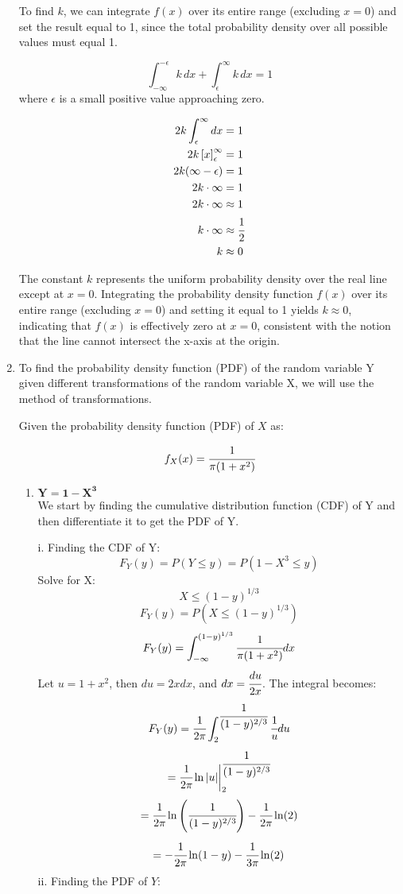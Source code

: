 \documentclass{article}
\begin{document}
\begin{enumerate}
    To find $k$, we can integrate $f(x)$ over its entire range (excluding $x=0$) and set the result equal to 1, since the total probability density over all possible values must equal 1.

    \[
    \int_{-\infty}^{-\epsilon} k\,dx + \int_{\epsilon}^{\infty} k\,dx = 1
    \]
    where $\epsilon$ is a small positive value approaching zero.

    \begin{align*}
    2k\int_{\epsilon}^{\infty} dx &= 1\\
    2k\left[x\right]_{\epsilon}^{\infty} &= 1\\
    2k(\infty - \epsilon) &= 1\\
    2k \cdot \infty &= 1\\
    2k \cdot \infty &\approx 1\\
    k \cdot \infty &\approx \cfrac{1}{2}\\
    k &\approx 0
    \end{align*}

    The constant $k$ represents the uniform probability density over the real line except at $x = 0$. Integrating the probability density function $f(x)$ over its entire range (excluding $x=0$) and setting it equal to 1 yields $k \approx 0$, indicating that $f(x)$ is effectively zero at $x = 0$, consistent with the notion that the line cannot intersect the x-axis at the origin.
    
\newpage
\item
    To find the probability density function (PDF) of the random variable Y given different transformations of the random variable X, we will use the method of transformations.

    Given the probability density function (PDF) of \( X \) as:

    \[ 
        f_X(x) = \cfrac{1}{\pi(1 + x^2)}
    \]
    \begin{enumerate}
        \item 
        \( \mathbf{Y = 1 - X^3}\)\\
        We start by finding the cumulative distribution function (CDF) of Y and then differentiate it to get the PDF of Y.

        i. Finding the CDF of Y:
        \[ 
            F_Y(y) = P(Y \leq y) = P(1 - X^3 \leq y) 
        \]
        Solve for X:
        \[ 
            X \leq (1 - y)^{1/3} 
        \]
        \[ 
            F_Y(y) = P(X \leq (1 - y)^{1/3}) 
        \]
        \[
            F_Y(y) = \int_{-\infty}^{(1 - y)^{1/3}} \cfrac{1}{\pi(1 + x^2)} dx
        \]
        Let $ u = 1 + x^2 $, then $ du = 2x dx $, and $ dx = \cfrac{du}{2x} $.
        The integral becomes:
        \[
            F_Y(y) = \cfrac{1}{2\pi} \int_{2}^{\cfrac{1}{(1 - y)^{2/3}}} \cfrac{1}{u} du
        \]
        \[
            = \cfrac{1}{2\pi} \ln|u| \bigg|_{2}^{\cfrac{1}{(1 - y)^{2/3}}}
        \]
        \[
            = \cfrac{1}{2\pi} \ln\left(\cfrac{1}{(1 - y)^{2/3}}\right) - \cfrac{1}{2\pi} \ln(2)
        \]
        \[
            = -\cfrac{1}{2\pi} \ln(1 - y) - \cfrac{1}{3\pi} \ln(2)
        \]
        ii. Finding the PDF of $Y$:


\end{enumerate}
\end{enumerate}
\end{document}
